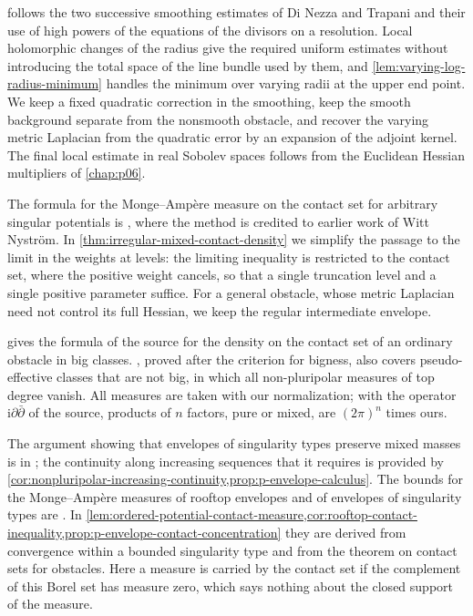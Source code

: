  follows the two successive smoothing estimates of Di Nezza and Trapani and their use of high powers of the equations of the divisors on a resolution. Local holomorphic changes of the radius give the required uniform estimates without introducing the total space of the line bundle used by them, and \cref{lem:varying-log-radius-minimum} handles the minimum over varying radii at the upper end point. We keep a fixed quadratic correction in the smoothing, keep the smooth background separate from the nonsmooth obstacle, and recover the varying metric Laplacian from the quadratic error by an expansion of the adjoint kernel. The final local estimate in real Sobolev spaces follows from the Euclidean Hessian multipliers of \cref{chap:p06}.

The formula for the Monge--Amp\`ere measure on the contact set for arbitrary singular potentials is \cite[Theorem 3.2 and its proof]{DNT2019v1}, where the method is credited to earlier work of Witt Nystr\"om. In \cref{thm:irregular-mixed-contact-density} we simplify the passage to the limit in the weights at levels: the limiting inequality is restricted to the contact set, where the positive weight cancels, so that a single truncation level and a single positive parameter suffice. For a general obstacle, whose metric Laplacian need not control its full Hessian, we keep the regular intermediate envelope.

 gives the formula of the source for the density on the contact set of an ordinary obstacle in big classes. , proved after the criterion for bigness, also covers pseudo-effective classes that are not big, in which all non-pluripolar measures of top degree vanish. All measures are taken with our normalization; with the operator $\mathrm i\partial\bar\partial$ of the source, products of $n$ factors, pure or mixed, are $(2\pi)^n$ times ours.

The argument showing that envelopes of singularity types preserve mixed masses is in \cite[Section 3B]{DDNL18mono}; the continuity along increasing sequences that it requires is provided by \cref{cor:nonpluripolar-increasing-continuity,prop:p-envelope-calculus}. The bounds for the Monge--Amp\`ere measures of rooftop envelopes and of envelopes of singularity types are \cite[Lemma 3.7 and Theorem 3.8]{DDNL18mono}. In \cref{lem:ordered-potential-contact-measure,cor:rooftop-contact-inequality,prop:p-envelope-contact-concentration} they are derived from convergence within a bounded singularity type and from the theorem on contact sets for obstacles. Here a measure is carried by the contact set if the complement of this Borel set has measure zero, which says nothing about the closed support of the measure.

